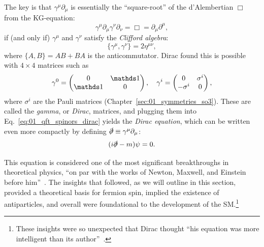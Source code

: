 The key is that $\gamma^\mu\partial_\mu$ is essentially the ``square-root'' of the d'Alembertian $\Box$ from the KG-equation:
\begin{equation}
	\label{eq:01_qft_spinors_dirac_wave}
	\gamma^\mu \partial_\mu \gamma^\nu \partial_\nu = \Box = \partial_\mu \partial^\mu,
\end{equation}
if (and only if) $\gamma^\mu$ and $\gamma^\nu$ satisfy the \textit{Clifford algebra}:
\begin{equation}
	\label{eq:01_qft_spinors_clifford_algebra}
	\{\gamma^\mu, \gamma^\nu\} = 2\eta^{\mu\nu},
\end{equation}
where $\{A, B\} = AB + BA$ is the anticommutator.
Dirac found this is possible with $4\times 4$ matrices such as
\begin{equation}
	\label{eq:01_qft_spinors_gamma_matrices_weyl_basis}
	\gamma^0 = \begin{pmatrix} 0 & \identity \\ \identity & 0 \end{pmatrix}, \quad 
	\gamma^i = \begin{pmatrix} 0 & \sigma^i \\ -\sigma^i & 0 \end{pmatrix},
\end{equation}
where $\sigma^i$ are the Pauli matrices (Chapter~\ref{sec:01_symmetries_so3}).
These are called the \textit{gamma}, or \textit{Dirac}, matrices, and plugging them into Eq.~\ref{eq:01_qft_spinors_dirac} yields the \textit{Dirac equation}, which can be written even more compactly by defining $\slashed{\partial} \equiv \gamma^\mu \partial_\mu$:
\begin{equation}
	\label{eq:01_qft_spinors_dirac_slash}
	(i\slashed{\partial} - m)\psi = 0.
\end{equation}

This equation is considered one of the most significant breakthroughs in theoretical physics, ``on par with the works of Newton, Maxwell, and Einstein before him''~\cite{hey2003new}.
The insights that followed, as we will outline in this section, provided a theoretical basis for fermion spin, implied the existence of antiparticles, and overall were foundational to the development of the SM.\footnote{These insights were so unexpected that Dirac thought ``his equation was more intelligent than its author''~\cite{brown1983birth}.}

